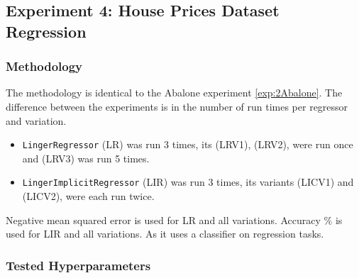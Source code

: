 \documentclass[a4paper, 12pt]{report}
\begin{document}
\subsection{Experiment 4: House Prices Dataset Regression}
\subsubsection{Methodology}
The methodology is identical to the Abalone experiment \ref{exp:2Abalone}. 
The difference between  the experiments is in the number of run times per regressor and variation.
\begin{itemize}
    \item \texttt{LingerRegressor} (LR) was run 3 times, its (LRV1), (LRV2), were run once and (LRV3) was run 5 times.
    \item \texttt{LingerImplicitRegressor} (LIR) was run 3 times, its variants (LICV1) and (LICV2), were each run twice.
\end{itemize}

Negative mean squared error is used for LR and all variations.
Accuracy $\%$ is used for LIR and all variations. As it uses a classifier on regression tasks.
\subsubsection{Tested Hyperparameters}
\end{document}
